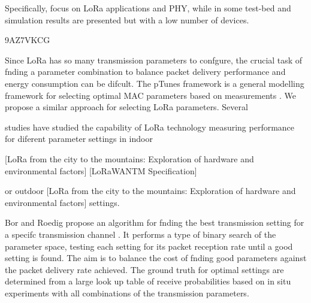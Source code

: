Specifically,
	\cite{atanasovski_long-range_2015}focus on LoRa applications and PHY,
	while in \cite{augustin_study_2016} some test-bed and simulation results are presented but with a low number of devices.




\cite{dix-matthews_lora_2018} 9AZ7VKCG

Since LoRa has so many transmission parameters to confgure,
	the crucial task of fnding a parameter combination to balance packet delivery performance and energy consumption can be difcult.
The pTunes framework is a general modelling framework for selecting optimal MAC parameters based on measurements \cite{zimmerling_ptunes_2012}.
We propose a similar approach for selecting LoRa parameters.
Several

studies have studied the capability of LoRa technology measuring performance for diferent parameter settings in indoor 

\cite{bor_lora_2017}
\cite{bor_lora_2016}
\cite{hutchison_data-aware_2013}
\cite{cardell-oliver_error_2012}
\cite{marco_cattani_experimental_2017}
[LoRa from the city to the mountains:
	Exploration of hardware and environmental factors] [LoRaWANTM Specification] \cite{marcelis_dare_2017}
\cite{petajajarvi_coverage_2015}
\cite{petajajarvi_evaluation_2017}

or outdoor \cite{augustin_study_2016}[LoRa from the city to the mountains:
	Exploration of hardware and environmental factors]\cite{marcelis_dare_2017} settings.

Bor and Roedig propose an algorithm for fnding the best transmission setting for a specifc transmission channel \cite{bor_lora_2017}.
It performs a type of binary search of the parameter space,
	testing each setting for its packet reception rate until a good setting is found.
The aim is to balance the cost of fnding good parameters against the packet delivery rate achieved.
The ground truth for optimal settings are determined from a large look up table of receive probabilities based on in situ experiments with all combinations of the transmission parameters.


